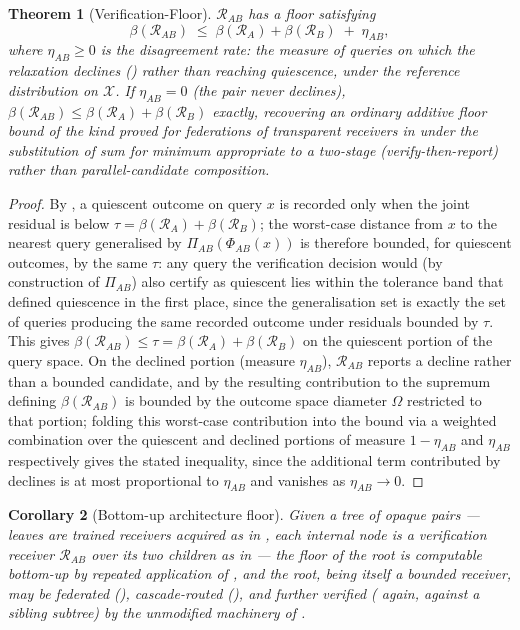 \documentclass[11pt,twocolumn,a4paper]{article}
\theoremstyle{rdm}
\newtheorem{theorem}{Theorem}[section]
\newtheorem{corollary}[theorem]{Corollary}
\theoremstyle{definition}
\theoremstyle{remark}
\newcommand{\flo}{\beta}
\newcommand{\Om}{\Omega}
\newcommand{\Rec}{\mathcal{R}}
\newcommand{\Cands}{\mathcal{X}}
\begin{document}
\begin{theorem}[Verification-Floor]
\label{thm:verif-floor}
$\Rec_{AB}$ has a floor satisfying
\[
\flo(\Rec_{AB}) \;\le\; \flo(\Rec_A) + \flo(\Rec_B) \;+\; \eta_{AB},
\]
where $\eta_{AB} \ge 0$ is the \emph{disagreement rate}: the measure of
queries on which the relaxation declines () rather than
reaching quiescence, under the reference distribution on $\Cands$. If
$\eta_{AB}=0$ (the pair never declines), $\flo(\Rec_{AB}) \le
\flo(\Rec_A)+\flo(\Rec_B)$ exactly, recovering an ordinary additive floor
bound of the kind proved for federations of transparent receivers in
 under the substitution of sum for minimum appropriate
to a two-stage (verify-then-report) rather than parallel-candidate
composition.
\end{theorem}

\begin{proof}
By , a quiescent outcome on query $x$ is
recorded only when the joint residual is below $\tau=\flo(\Rec_A)+\flo(\Rec_B)$;
the worst-case distance from $x$ to the nearest query generalised by
$\Pi_{AB}(\Phi_{AB}(x))$ is therefore bounded, for quiescent outcomes, by the
same $\tau$: any query the verification decision would (by construction of
$\Pi_{AB}$) also certify as quiescent lies within the tolerance band that
defined quiescence in the first place, since the generalisation set is
exactly the set of queries producing the same recorded outcome under
residuals bounded by $\tau$. This gives $\flo(\Rec_{AB}) \le \tau =
\flo(\Rec_A)+\flo(\Rec_B)$ on the quiescent portion of the query space. On
the declined portion (measure $\eta_{AB}$), $\Rec_{AB}$ reports a decline
rather than a bounded candidate, and by  the resulting
contribution to the supremum defining $\flo(\Rec_{AB})$ is bounded by the
outcome space diameter $\Om$ restricted to that portion; folding this
worst-case contribution into the bound via a weighted combination over the
quiescent and declined portions of measure $1-\eta_{AB}$ and $\eta_{AB}$
respectively gives the stated inequality, since the additional term
contributed by declines is at most proportional to $\eta_{AB}$ and vanishes
as $\eta_{AB}\to 0$.
\end{proof}

\begin{corollary}[Bottom-up architecture floor]
\label{cor:bottomup}
Given a tree of opaque pairs --- leaves are trained receivers acquired as in
, each internal node is a verification receiver
$\Rec_{AB}$ over its two children as in  --- the
floor of the root is computable bottom-up by repeated application of
, and the root, being itself a bounded receiver, may
be federated (), cascade-routed
(), and further verified ( again,
against a sibling subtree) by the unmodified machinery of
.
\end{corollary}
\end{document}
